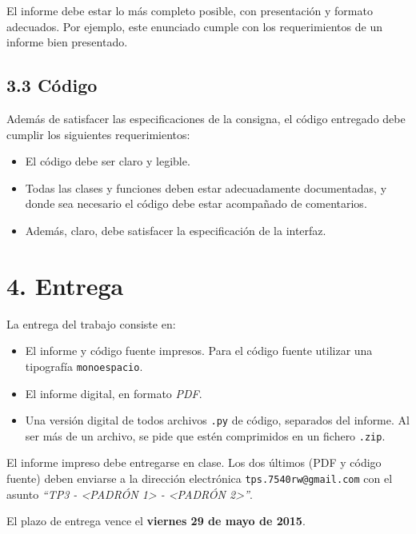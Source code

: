 \documentclass[12pt,spanish,]{article}
\begin{document}
El informe debe estar lo más completo posible, con presentación y
formato adecuados. Por ejemplo, este enunciado cumple con los
requerimientos de un informe bien presentado.

\subsection{3.3 Código}\label{cuxf3digo}

Además de satisfacer las especificaciones de la consigna, el código
entregado debe cumplir los siguientes requerimientos:

\begin{itemize}
\item
  El código debe ser claro y legible.
\item
  Todas las clases y funciones deben estar adecuadamente documentadas, y
  donde sea necesario el código debe estar acompañado de comentarios.
\item
  Además, claro, debe satisfacer la especificación de la interfaz.
\end{itemize}

\section{4. Entrega}\label{entrega}

La entrega del trabajo consiste en:

\begin{itemize}
\item
  El informe y código fuente impresos. Para el código fuente utilizar
  una tipografía \texttt{monoespacio}.
\item
  El informe digital, en formato \emph{PDF}.
\item
  Una versión digital de todos archivos \texttt{.py} de código,
  separados del informe. Al ser más de un archivo, se pide que estén
  comprimidos en un fichero \texttt{.zip}.
\end{itemize}

El informe impreso debe entregarse en clase. Los dos últimos (PDF y
código fuente) deben enviarse a la dirección electrónica
\texttt{tps.7540rw@gmail.com} con el asunto \emph{``TP3 -
\textless{}PADRÓN 1\textgreater{} - \textless{}PADRÓN
2\textgreater{}''}.

El plazo de entrega vence el \textbf{viernes 29 de mayo de 2015}.
\end{document}
